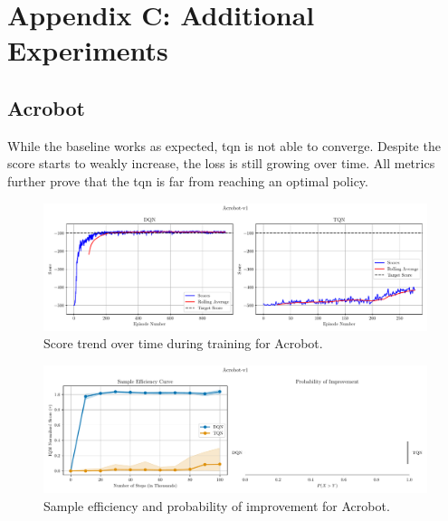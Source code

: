 \section*{Appendix C: Additional Experiments} \label{section:appendix_c}

\subsection*{Acrobot}

While the baseline works as expected, \acrshort{tqn} is not able to converge. Despite the score starts to weakly increase, the loss is still growing over time. All metrics further prove that the \acrlong{tqn} is far from reaching an optimal policy.

\begin{figure}[!htbp]
\centering
\includegraphics[width=\textwidth]{images/score-vs-episode_DQN-TQN_Acrobot-v1.pdf}
\caption{Score trend over time during training for Acrobot.}
\label{fig:score-vs-episode-Acrobot-v1}
\end{figure}

\begin{figure}[!htbp]
\centering
\includegraphics[width=\textwidth]{images/sample-efficiency-probability-improvement_DQN-TQN_Acrobot-v1.pdf}
\caption{Sample efficiency and probability of improvement for Acrobot.}
\label{fig:sample-efficiency-Acrobot-v1}
\end{figure}

